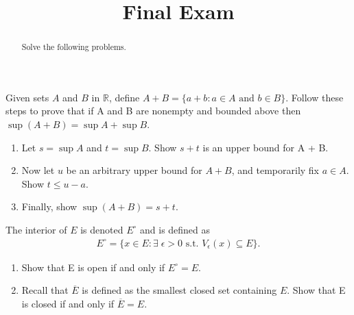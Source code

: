 \documentclass{ximera}
\begin{document}
    \title{Final Exam}
    \begin{abstract} Solve the following problems. \end{abstract}
    \maketitle
    
\begin{exercise}
  Given sets $A$ and $B$ in $\mathbb{R}$, define $A+B = \{a+b : a \in A \text{ and }  b \in B\}$.
Follow these steps to prove that if A and B are nonempty and bounded above
then $\sup(A + B) = \sup A + \sup B.$
\begin{enumerate}
    \item Let $s = \sup A$ and $t = \sup B$. Show $s + t$ is an upper bound for A + B.
    \vfill
    \item Now let $u$ be an arbitrary upper bound for $A + B$, and temporarily fix $a \in A$. Show $t \leq u - a$.
    \vfill
\item Finally, show $\sup(A + B) = s + t$.
\vfill
\end{enumerate}
\end{exercise}
 \newpage

\begin{exercise}
    The interior of $E$ is denoted $E^\circ$ and is defined as
\begin{align*}
    E^\circ = \{x \in E : \exists \; \epsilon > 0  \text{ s.t. } V_\epsilon(x) \subseteq E\}.
\end{align*}
\begin{enumerate}
    \item Show that E is open if and only if $E^\circ = E$.
    \vfill
    \item Recall that $\overline{E}$ is defined as the smallest closed set containing $E$.  Show that E is closed if and only if $\overline{E}  = E$.
    \vfill
\end{enumerate}
\end{exercise}
\newpage
\end{document}
